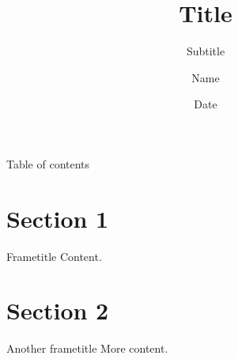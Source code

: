 \documentclass[11pt,t]{beamer}
\title{Title}
\subtitle{Subtitle}
\author{Name}
\institute{School}
\date{Date}
\begin{document}
\begin{frame}
	\titlepage
\end{frame}

\begin{frame}{Table of contents}
\tableofcontents
\end{frame}

\section{Section 1} %

\begin{frame}{Frametitle}
	Content.
\end{frame}

\section{Section 2}

\begin{frame}{Another frametitle}
More content. 
\end{frame}
\end{document}
